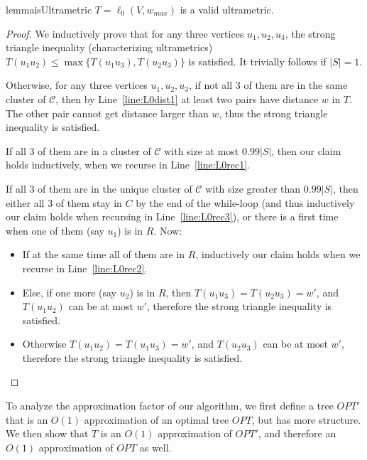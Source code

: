 \documentclass{article}
\newcommand{\set}[1]{\{#1\}}
\newcommand{\calC}{\mathcal{C}}
\begin{document}
\begin{restatable}{lemma}{isUltrametric}\label{lem:isUltrametric}
$T = \ell_0(V, w_{max})$ is a valid ultrametric.
\end{restatable}
\begin{proof}
We inductively prove that for any three vertices $u_1,u_2,u_3$, the strong triangle inequality (characterizing ultrametrics) $T(u_1u_2) \le \max\set{T(u_1u_3), T(u_2u_3)}$ is satisfied.
It trivially follows if $|S|=1$.

Otherwise, for any three vertices $u_1,u_2,u_3$, if not all $3$ of them are in the same cluster of $\calC$, then by Line~\ref{line:L0dist1} at least two pairs have distance $w$ in $T$.
The other pair cannot get distance larger than $w$, thus the strong triangle inequality is satisfied.

If all $3$ of them are in a cluster of $\calC$ with size at most $0.99|S|$, then our claim holds inductively, when we recurse in Line~\ref{line:L0rec1}.

If all $3$ of them are in the unique cluster of $\calC$ with size greater than $0.99|S|$, then either all $3$ of them stay in $C$ by the end of the while-loop (and thus inductively our claim holds when recursing in Line~\ref{line:L0rec3}), or there is a first time when one of them (say $u_1$) is in $R$.
Now:
\begin{itemize}
    \item If at the same time all of them are in $R$, inductively our claim holds when we recurse in Line~\ref{line:L0rec2}.
    \item Else, if one more (say $u_2$) is in $R$, then $T(u_1u_3) = T(u_2u_3) = w'$, and $T(u_1u_2)$ can be at most $w'$, therefore the strong triangle inequality is satisfied.
    \item Otherwise $T(u_1u_2) = T(u_1u_3) = w'$, and $T(u_2u_3)$ can be at most $w'$, therefore the strong triangle inequality is satisfied.
\end{itemize}
\end{proof}

To analyze the approximation factor of our algorithm, we first define a tree $OPT'$ that is an $O(1)$ approximation of an optimal tree $OPT$, but has more structure.
We then show that $T$ is an $O(1)$ approximation of $OPT'$, and therefore an $O(1)$ approximation of $OPT$ as well.
\end{document}
